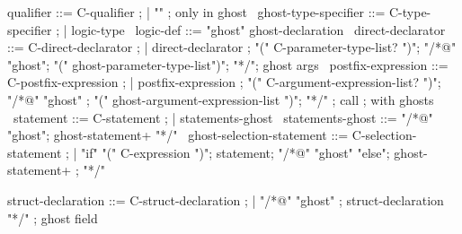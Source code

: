 \begin{syntax}

  qualifier ::= C-qualifier ;
  | "\ghost" ; only in ghost
  \
  ghost-type-specifier ::= C-type-specifier ;
  | {logic-type} \
  logic-def ::= "ghost" ghost-declaration \
  direct-declarator ::= C-direct-declarator ;
    | direct-declarator ;
    "(" C-parameter-type-list? ")";
        "/*@" "ghost";
          "(" ghost-parameter-type-list")";
          "*/"; ghost args
        \
  postfix-expression ::= C-postfix-expression ;
    | postfix-expression ;
     "(" C-argument-expression-list? ")";
     "/*@" "ghost" ;
       "(" ghost-argument-expression-list ")";
       "*/" ; call
              ; with ghosts
    \
  statement ::= C-statement ;
             | statements-ghost \
  statements-ghost ::= "/*@" "ghost";
                       ghost-statement+ "*/" \
  ghost-selection-statement ::= C-selection-statement ;
    | "if" "(" C-expression ")";
       statement;
      "/*@" "ghost" "else";
        ghost-statement+ ;
        "*/" \

  struct-declaration ::= C-struct-declaration ;
  | {"/*@" "ghost" };
    { struct-declaration "*/"} ; ghost field

\end{syntax}

